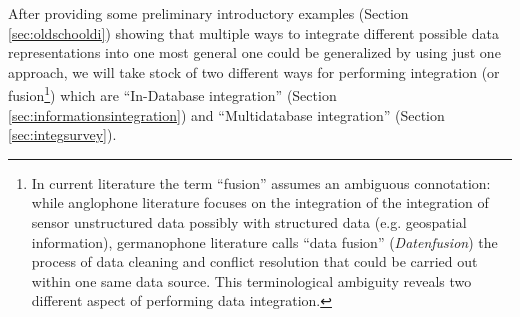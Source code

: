 After providing some preliminary introductory examples (Section \ref{sec:oldschooldi}) showing that multiple ways to integrate different possible data representations into one most general one could be generalized by using just one approach, we will take stock of two different ways for performing integration (or fusion\footnote{In current literature the term ``fusion'' assumes an ambiguous connotation: while anglophone literature \cite{Hall97,KHALEGHI201328} focuses on the integration of the integration of sensor unstructured data possibly with structured data (e.g. geospatial information), germanophone literature \cite{deII,Bleiholder09} calls ``data fusion'' (\textit{Datenfusion}) the process of data cleaning and conflict resolution that could be carried out within one same data source. This terminological ambiguity reveals two different aspect of performing data integration.}) which are ``In-Database integration'' (Section \ref{sec:informationsintegration}) and ``Multidatabase integration'' (Section \ref{sec:integsurvey}).


